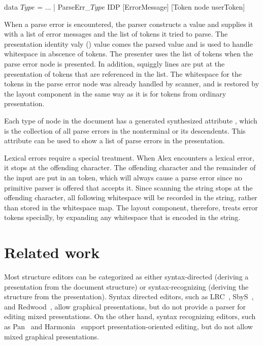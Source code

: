 \documentclass[12pt]{article}
\begin{document}
\begin{footnotesize}
\begin{tabbedCode}
data $Type$ =
  ...
  | ParseErr\_$Type$ IDP [ErrorMessage] [Token node userToken] 
\end{tabbedCode}
\end{footnotesize}

When a parse error is encountered, the parser constructs a  value and supplies it with a list of error messages and the list of tokens it tried to parse. The presentation identity valy () value comes the parsed  value and is used to handle whitespace in abscence of tokens. The presenter uses the list of tokens when the parse error node is presented. In addition, squiggly lines are put at the presentation of tokens that are referenced in the  list. The whitespace for the tokens in the parse error node was already handled by scanner, and is restored by the layout component in the same way as it is for tokens from ordinary presentation.

Each type of node in the document has a generated synthesized attribute , which is the collection of all parse errors in the nonterminal or its descendents. This attribute can be used to show a list of parse errors in the presentation. 


Lexical errors require a special treatment. When Alex encounters a lexical error, it stops at the offending character. The offending character and the remainder of the input are put in an  token, which will always cause a parse error since no primitive parser is offered that accepts it. Since scanning the string stops at the offending character, all following whitespace  will be recorded in the string, rather than stored in the whitespace map. The layout component, therefore, treats error tokens specially, by expanding any whitespace that is encoded in the string. %






%
\section{Related work}\label{sect:relatedWork}
%

Most structure editors can be categorized as either syntax-directed (deriving a presentation from the document structure) or syntax-recognizing (deriving the structure from the presentation). Syntax directed editors, such as LRC~\cite{saraiva00lrc}, SbyS~\cite{magnusson90orm}, and Redwood~\cite{westphal04redwood}, allow graphical presentations, but do not provide a parser for editing mixed presentations. On the other hand, syntax recognizing editors, such as Pan~\cite{ballance92pan} and Harmonia~\cite{boshernitsan01harmonia} support presentation-oriented editing, but do not allow mixed graphical presentations.
\end{document}
